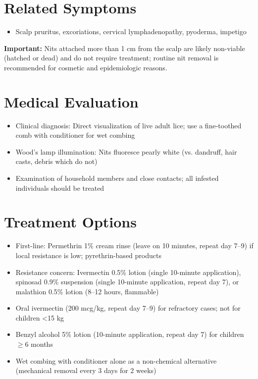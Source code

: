\section*{Related Symptoms}
\begin{itemize}
  \item Scalp pruritus, excoriations, cervical lymphadenopathy, pyoderma, impetigo
\end{itemize}
\textbf{Important:} Nits attached more than 1 cm from the scalp are likely non-viable (hatched or dead) and do not require treatment; routine nit removal is recommended for cosmetic and epidemiologic reasons.

\section*{Medical Evaluation}
\begin{itemize}
  \item Clinical diagnosis: Direct visualization of live adult lice; use a fine-toothed comb with conditioner for wet combing
  \item Wood's lamp illumination: Nits fluoresce pearly white (vs. dandruff, hair casts, debris which do not)
  \item Examination of household members and close contacts; all infested individuals should be treated
\end{itemize}

\section*{Treatment Options}
\begin{itemize}
  \item First-line: Permethrin 1\% cream rinse (leave on 10 minutes, repeat day 7--9) if local resistance is low; pyrethrin-based products
  \item Resistance concern: Ivermectin 0.5\% lotion (single 10-minute application), spinosad 0.9\% suspension (single 10-minute application, repeat day 7), or malathion 0.5\% lotion (8--12 hours, flammable)
  \item Oral ivermectin (200 mcg/kg, repeat day 7--9) for refractory cases; not for children <15 kg
  \item Benzyl alcohol 5\% lotion (10-minute application, repeat day 7) for children \ensuremath{\geq}6 months
  \item Wet combing with conditioner alone as a non-chemical alternative (mechanical removal every 3 days for 2 weeks)
\end{itemize}

